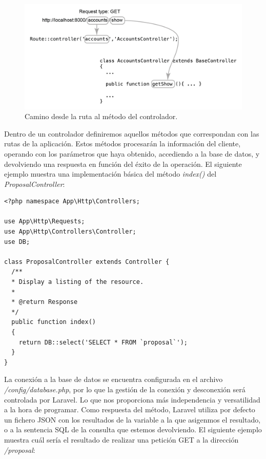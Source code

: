\begin{figure}[H]
\centering
\includegraphics[keepaspectratio, scale=1]{Media/Captures/getDiagramMethod.png}
\caption{Camino desde la ruta al método del controlador.}
\label{fig:laravelArch}
\end{figure}

Dentro de un controlador definiremos aquellos métodos que correspondan con las rutas de la aplicación. Estos métodos procesarán la información del cliente, operando con los parámetros que haya obtenido, accediendo a la base de datos, y devolviendo una respuesta en función del éxito de la operación. El siguiente ejemplo muestra una implementación básica del método \textit{index()} del \textit{ProposalController}:

\lstset{
  language        = php}
\begin{lstlisting}[frame=single]
<?php namespace App\Http\Controllers;

use App\Http\Requests;
use App\Http\Controllers\Controller;
use DB;

class ProposalController extends Controller {
  /**
  * Display a listing of the resource.
  *
  * @return Response
  */
  public function index()
  {
    return DB::select('SELECT * FROM `proposal`');
  }
}
\end{lstlisting}

La conexión a la base de datos se encuentra configurada en el archivo \textit{/config/database.php}, por lo que la gestión de la conexión y desconexión será controlada por Laravel. Lo que nos proporciona más independencia y versatilidad a la hora de programar. Como respuesta del método, Laravel utiliza por defecto un fichero JSON con los resultados de la variable a la que asigenmos el resultado, o a la sentencia SQL de la consulta que estemos devolviendo. El siguiente ejemplo muestra cuál sería el resultado de realizar una petición GET a la dirección \textit{/proposal}:

